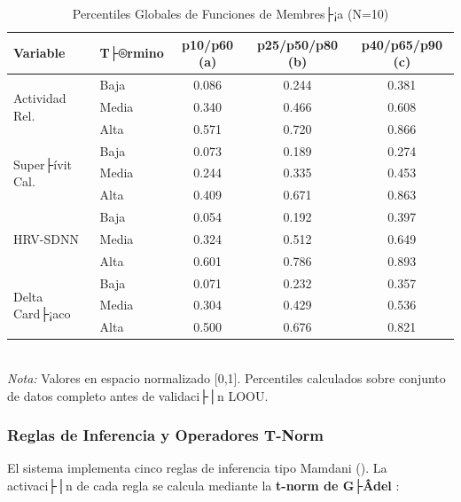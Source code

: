 \begin{table}[H]
\centering
\caption{Percentiles Globales de Funciones de Membres├¡a (N=10)}
\label{tab:percentiles_globales}
\small
\begin{tabular}{@{}llccc@{}}
\toprule
\textbf{Variable} & \textbf{T├®rmino} & \textbf{p10/p60 (a)} & \textbf{p25/p50/p80 (b)} & \textbf{p40/p65/p90 (c)} \\
\midrule
\multirow{3}{*}{Actividad Rel.} & Baja  & 0.086 & 0.244 & 0.381 \\
                                  & Media & 0.340 & 0.466 & 0.608 \\
                                  & Alta  & 0.571 & 0.720 & 0.866 \\
\midrule
\multirow{3}{*}{Super├ívit Cal.} & Baja  & 0.073 & 0.189 & 0.274 \\
                                 & Media & 0.244 & 0.335 & 0.453 \\
                                 & Alta  & 0.409 & 0.671 & 0.863 \\
\midrule
\multirow{3}{*}{HRV-SDNN}       & Baja  & 0.054 & 0.192 & 0.397 \\
                                 & Media & 0.324 & 0.512 & 0.649 \\
                                 & Alta  & 0.601 & 0.786 & 0.893 \\
\midrule
\multirow{3}{*}{Delta Card├¡aco} & Baja  & 0.071 & 0.232 & 0.357 \\
                                 & Media & 0.304 & 0.429 & 0.536 \\
                                 & Alta  & 0.500 & 0.676 & 0.821 \\
\bottomrule
\end{tabular}
\\[5pt]
\footnotesize{\textit{Nota:} Valores en espacio normalizado [0,1]. Percentiles calculados sobre conjunto de datos completo antes de validaci├│n LOOU.}
\end{table}

\subsubsection{Reglas de Inferencia y Operadores T-Norm}
\label{subsubsec:reglas_inferencia}

El sistema implementa cinco reglas de inferencia tipo Mamdani (). La activaci├│n de cada regla se calcula mediante la \textbf{t-norm de G├Âdel} \citep{Ross2010}:

